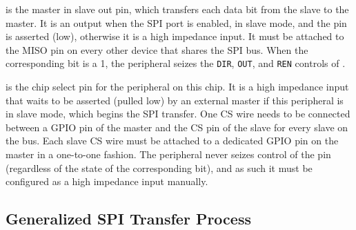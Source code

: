  is the master in slave out pin, which transfers each data bit from the slave to the master. It is an output when the SPI port is enabled, in slave mode, and the  pin is asserted (low), otherwise it is a high impedance input. It must be attached to the MISO pin on every other device that shares the SPI bus. When the corresponding  bit is a 1, the  peripheral seizes the \texttt{DIR}, \texttt{OUT}, and \texttt{REN} controls of .

 is the chip select pin for the  peripheral on this chip. It is a high impedance input that waits to be asserted (pulled low) by an external master if this  peripheral is in slave mode, which begins the SPI transfer. One CS wire needs to be connected between a GPIO pin of the master and the CS pin of the slave for every slave on the bus. Each slave CS wire must be attached to a dedicated GPIO pin on the master in a one-to-one fashion. The  peripheral never seizes control of the  pin (regardless of the state of the corresponding  bit), and as such it must be configured as a high impedance input manually.

\subsection{Generalized SPI Transfer Process}

